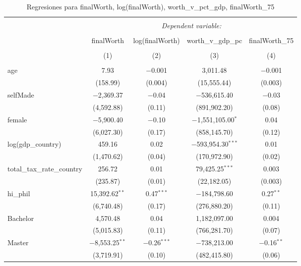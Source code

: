 
\begin{table}[!htbp] \centering 
  \caption{Regresiones para finalWorth, log(finalWorth), worth_v_pct_gdp, finalWorth_75} 
  \label{tab:finalWorth_regresiones} 
\footnotesize 
\begin{tabular}{@{\extracolsep{1pt}}lcccc} 
\\[-1.8ex]\hline 
\hline \\[-1.8ex] 
 & \multicolumn{4}{c}{\textit{Dependent variable:}} \\ 
\cline{2-5} 
\\[-1.8ex] & finalWorth & log(finalWorth) & worth\_v\_gdp\_pc & finalWorth\_75 \\ 
\\[-1.8ex] & (1) & (2) & (3) & (4)\\ 
\hline \\[-1.8ex] 
 age & 7.93 & $-$0.001 & 3,011.48 & $-$0.001 \\ 
  & (158.99) & (0.004) & (15,555.44) & (0.003) \\ 
  selfMade & $-$2,369.37 & $-$0.04 & $-$536,615.40 & $-$0.03 \\ 
  & (4,592.88) & (0.11) & (891,902.20) & (0.08) \\ 
  female & $-$5,900.40 & $-$0.10 & $-$1,551,105.00$^{*}$ & 0.04 \\ 
  & (6,027.30) & (0.17) & (858,145.70) & (0.12) \\ 
  log(gdp\_country) & 459.16 & 0.02 & $-$593,954.30$^{***}$ & 0.01 \\ 
  & (1,470.62) & (0.04) & (170,972.90) & (0.02) \\ 
  total\_tax\_rate\_country & 256.72 & 0.01 & 79,425.25$^{***}$ & 0.003 \\ 
  & (235.87) & (0.01) & (22,182.05) & (0.003) \\ 
  hi\_phil & 15,392.62$^{**}$ & 0.47$^{***}$ & $-$184,798.60 & 0.27$^{**}$ \\ 
  & (6,740.48) & (0.17) & (276,880.20) & (0.11) \\ 
  Bachelor & 4,570.48 & 0.04 & 1,182,097.00 & 0.004 \\ 
  & (5,015.83) & (0.11) & (766,281.70) & (0.07) \\ 
  Master & $-$8,553.25$^{**}$ & $-$0.26$^{***}$ & $-$738,213.00 & $-$0.16$^{**}$ \\ 
  & (3,719.91) & (0.10) & (482,415.80) & (0.06) \\ 

\end{tabular}
\end{table}
